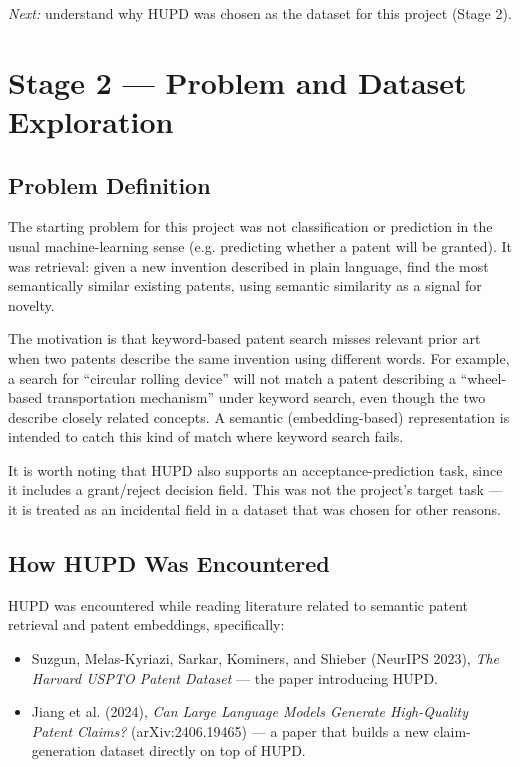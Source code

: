 \documentclass[11pt]{article}
\begin{document}
\noindent \textit{Next:} understand why HUPD was chosen as the dataset for this project (Stage 2).

\section{Stage 2 --- Problem and Dataset Exploration}

\subsection{Problem Definition}

The starting problem for this project was not classification or prediction in the usual machine-learning sense (e.g. predicting whether a patent will be granted). It was retrieval: given a new invention described in plain language, find the most semantically similar existing patents, using semantic similarity as a signal for novelty.

The motivation is that keyword-based patent search misses relevant prior art when two patents describe the same invention using different words. For example, a search for ``circular rolling device'' will not match a patent describing a ``wheel-based transportation mechanism'' under keyword search, even though the two describe closely related concepts. A semantic (embedding-based) representation is intended to catch this kind of match where keyword search fails.

It is worth noting that HUPD also supports an acceptance-prediction task, since it includes a grant/reject decision field. This was not the project's target task --- it is treated as an incidental field in a dataset that was chosen for other reasons.

\subsection{How HUPD Was Encountered}

HUPD was encountered while reading literature related to semantic patent retrieval and patent embeddings, specifically:

\begin{itemize}
    \item Suzgun, Melas-Kyriazi, Sarkar, Kominers, and Shieber (NeurIPS 2023), \textit{The Harvard USPTO Patent Dataset} --- the paper introducing HUPD.
    \item Jiang et al. (2024), \textit{Can Large Language Models Generate High-Quality Patent Claims?} (arXiv:2406.19465) --- a paper that builds a new claim-generation dataset directly on top of HUPD.
\end{itemize}
\end{document}

